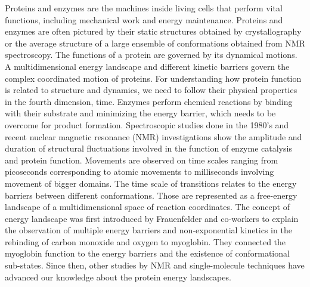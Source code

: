 Proteins and enzymes are the machines inside living cells that perform vital functions, including mechanical work and energy maintenance.
Proteins and enzymes are often pictured by their static structures obtained by crystallography or the average structure of a large ensemble of conformations obtained from NMR spectroscopy.
The functions of a protein are governed by its dynamical motions.
A multidimensional energy landscape and different kinetic barriers govern the complex coordinated motion of proteins.
For understanding how protein function is related to structure and dynamics, we need to follow their physical properties in the fourth dimension, time.
Enzymes perform chemical reactions by binding with their substrate and minimizing the energy barrier, which needs to be overcome for product formation.
Spectroscopic studies done in the 1980's and recent nuclear magnetic resonance (NMR) investigations show the amplitude and duration of structural fluctuations involved in the function of enzyme catalysis and protein function.
Movements are observed on time scales ranging from picoseconds corresponding to atomic movements to milliseconds involving movement of bigger domains.\cite{henzler-wildman2007dynamic,frauenfelder1991the}
The time scale of transitions relates to the energy barriers between different conformations. Those are represented as a free-energy landscape of a multidimensional space of reaction coordinates.
The concept of energy landscape was first introduced by Frauenfelder and co-workers\cite{frauenfelder1991the} to explain the observation of multiple energy barriers and non-exponential kinetics in the rebinding of carbon monoxide and oxygen to myoglobin.
They connected the myoglobin function to the energy barriers and the existence of conformational sub-states.
Since then, other studies by NMR and single-molecule techniques have advanced our knowledge about the protein energy landscapes.

